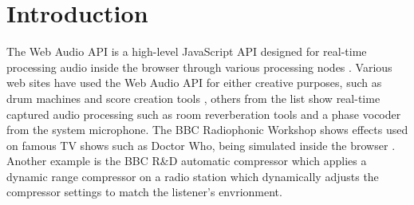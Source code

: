 \documentclass{article}
\title{\papertitle}
\begin{document}
%
\capstartfalse
\maketitle
\capstarttrue
%
\begin{abstract}
New functionality in HTML5, notably its Web Audio API, allow for increasingly powerful applications in the browser. %
Perceptual evaluation tests for audio, where the subject assesses certain qualities of different audio fragments through a graphical user interface and/or text boxes, require playback of audio and rapid switching between different files. %
The advantage of a web application is easy deployment on any platform, without requiring any other application or library, easy storing of results on a server. 
[...]

\end{abstract}


\section{Introduction}\label{sec:introduction}


The Web Audio API is a high-level JavaScript API designed for real-time processing audio inside the browser through various processing nodes \cite{webaudioapi}. Various web sites have used the Web Audio API for either creative purposes, such as drum machines and score creation tools \cite{webaudiodemo}, %
others from the list show real-time captured audio processing such as room reverberation tools and a phase vocoder from the system microphone. The BBC Radiophonic Workshop shows effects used on famous TV shows such as Doctor Who, being simulated inside the browser \cite{bbcradiophonics}. %
Another example is the BBC R\&D automatic compressor which applies a dynamic range compressor on a radio station which dynamically adjusts the compressor settings to match the listener's envrionment.\\ %
\end{document}
